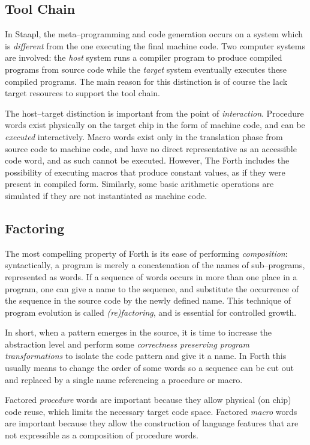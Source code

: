 \documentclass[12pt]{article}
\begin{document}
\subsection{Tool Chain}

In Staapl, the meta--programming and code generation occurs on a
system which is \emph{different} from the one executing the final
machine code. Two computer systems are involved: the \emph{host}
system runs a compiler program to produce compiled programs from
source code while the \emph{target} system eventually executes these
compiled programs. The main reason for this distinction is of course
the lack target resources to support the tool chain.

The host--target distinction is important from the point of
\emph{interaction}.  Procedure words exist physically on the target
chip in the form of machine code, and can be \emph{executed}
interactively. Macro words exist only in the translation phase from
source code to machine code, and have no direct representative as an
accessible code word, and as such cannot be executed. However, The Forth
includes the possibility of executing macros that produce constant
values, as if they were present in compiled form. Similarly, some
basic arithmetic operations are simulated if they are not instantiated
as machine code.



\subsection{Factoring}

The most compelling property of Forth is its ease of performing
\emph{composition}: syntactically, a program is merely a concatenation
of the names of sub--programs, represented as words. If a sequence of
words occurs in more than one place in a program, one can give a name
to the sequence, and substitute the occurrence of the sequence in the
source code by the newly defined name. This technique of program
evolution is called \emph{(re)factoring}, and is essential for
controlled growth. 

In short, when a pattern emerges in the source, it is time to increase
the abstraction level and perform some \emph{correctness preserving
  program transformations} to isolate the code pattern and give it a
name. In Forth this usually means to change the order of some words so
a sequence can be cut out and replaced by a single name referencing a
procedure or macro.

Factored \emph{procedure} words are important because they allow
physical (on chip) code reuse, which limits the necessary target code
space. Factored \emph{macro} words are important because they allow
the construction of language features that are not expressible as a
composition of procedure words.
\end{document}
